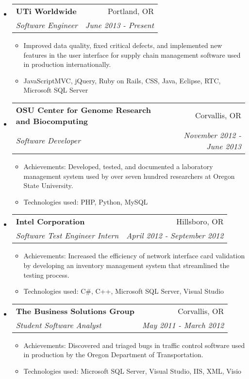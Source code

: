 \documentclass[letterpaper,11pt]{article}
\makeatletter
\newcommand{\resitem}[1]{\item #1 \vspace{-2pt}}
\newcommand{\ressubheading}[4]{

\begin{tabular*}{6.5in}{l@{\cftdotfill{\cftsecdotsep}\extracolsep{\fill}}r}

\textbf{#1} & #2 \\

\textit{#3} & \textit{#4} \\

\end{tabular*}\vspace{-6pt}}
\makeatother
\begin{document}
\begin{itemize}

	\item

		\ressubheading{UTi Worldwide}{Portland, OR}{Software Engineer}{June 2013 - Present}

		\begin{itemize}

		\resitem{Improved data quality, fixed critical defects, and implemented new features in the user interface for supply chain management software used in production internationally.}
		\resitem{JavaScriptMVC, jQuery, Ruby on Rails, CSS, Java, Eclipse, RTC, Microsoft SQL Server}

		\end{itemize}

	\item
        
	\ressubheading{OSU Center for Genome Research and Biocomputing}{Corvallis, OR}{Software Developer}{November 2012 - June 2013}

        \begin{itemize}

    	\resitem{Achievements: Developed, tested, and documented a laboratory management system used by over seven hundred researchers at Oregon State University.}
		\resitem{Technologies used: PHP, Python, MySQL}

		\end{itemize}

	\item
        
	\ressubheading{Intel Corporation}{Hillsboro, OR}{Software Test Engineer Intern}{April 2012 - September 2012}

        \begin{itemize}

    	\resitem{Achievements: Increased the efficiency of network interface card validation by developing an inventory management system that streamlined the testing process.}
		\resitem{Technologies used: C\#, C++, Microsoft SQL Server, Visual Studio}

		\end{itemize}

	\item
	
	\ressubheading{The Business Solutions Group}{Corvallis, OR}{Student Software Analyst}{May 2011 -  March 2012}

       	\begin{itemize}

		\resitem{Achievements: Discovered and triaged bugs in traffic control software used in production by the Oregon Department of Transportation.}
		\resitem{Technologies used: Microsoft SQL Server, Visual Studio, IIS, XML, Visio }

		\end{itemize}
	
\end{itemize}
\end{document}
